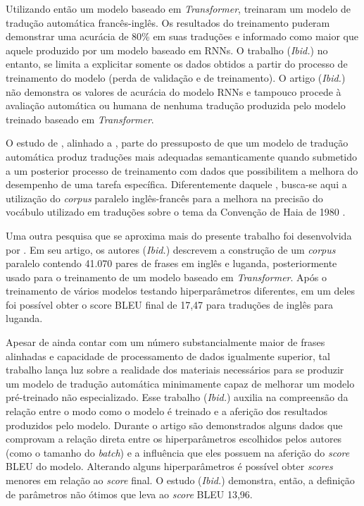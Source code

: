 \documentclass[portuguese]{textolivre}
\begin{document}
Utilizando então um modelo baseado em \textit{Transformer}, \textcite{tian_french--english_2022} treinaram um modelo de tradução automática francês-inglês. Os resultados do treinamento puderam demonstrar uma acurácia de 80\% em suas traduções e informado como maior que aquele produzido por um modelo baseado em RNNs. O trabalho (\textit{Ibid.}) no entanto, se limita a explicitar somente os dados obtidos a partir do processo de treinamento do modelo (perda de validação e de treinamento). O artigo (\textit{Ibid.}) não demonstra os valores de acurácia do modelo RNNs e tampouco procede à avaliação automática ou humana de nenhuma tradução produzida pelo modelo treinado baseado em \textit{Transformer}.

O estudo de \textcite{iosifova_techniques_2020}, alinhado a \textcite{koponen_is_2016,costa_translation_2020}, parte do pressuposto de que um modelo de tradução automática produz traduções mais adequadas semanticamente quando submetido a um posterior processo de treinamento com dados que possibilitem a melhora do desempenho de uma tarefa específica. Diferentemente daquele \cite{iosifova_techniques_2020}, busca-se aqui a utilização do \textit{corpus} paralelo inglês-francês para a melhora na precisão do vocábulo utilizado em traduções sobre o tema da Convenção de Haia de 1980 \cite{hcch_convention_1980}.

Uma outra pesquisa que se aproxima mais do presente trabalho foi desenvolvida por \textcite{kimera_building_2022}. Em seu artigo, os autores (\textit{Ibid.}) descrevem a construção de um \textit{corpus} paralelo contendo 41.070 pares de frases em inglês e luganda, posteriormente usado para o treinamento de um modelo baseado em \textit{Transformer}. Após o treinamento de vários modelos testando hiperparâmetros diferentes, em um deles foi possível obter o score BLEU final de 17,47 para traduções de inglês para luganda.

Apesar de ainda contar com um número substancialmente maior de frases alinhadas e capacidade de processamento de dados igualmente superior, tal trabalho \cite{kimera_building_2022} lança luz sobre a realidade dos materiais necessários para se produzir um modelo de tradução automática minimamente capaz de melhorar um modelo pré-treinado não especializado. Esse trabalho (\textit{Ibid.}) auxilia na compreensão da relação entre o modo como o modelo é treinado e a aferição dos resultados produzidos pelo modelo. Durante o artigo são demonstrados alguns dados que comprovam a relação direta entre os hiperparâmetros escolhidos pelos autores (como o tamanho do \textit{batch}) e a influência que eles possuem na aferição do \textit{score} BLEU do modelo. Alterando alguns hiperparâmetros é possível obter \textit{scores} menores em relação ao \textit{score} final. O estudo (\textit{Ibid.}) demonstra, então, a definição de parâmetros não ótimos que leva ao \textit{score} BLEU 13,96.
\end{document}
